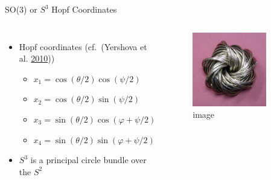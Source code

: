 \documentclass[10pt,ignorenonframetext,serif,onlymath]{beamer}
\begin{document}
\begin{frame}{SO(3) or \(S^3\) Hopf Coordinates}
\protect\hypertarget{so3-or-s3-hopf-coordinates}{}

\begin{columns}


\begin{itemize}
\item
  Hopf coordinates (cf.~(Yershova et al.
  \protect\hyperlink{ref-yershova2010generating}{2010}))

  \begin{itemize}
  \item
    \(x_1 = \cos(\theta/2) \cos(\psi/2)\)
  \item
    \(x_2 = \cos(\theta/2) \sin(\psi/2)\)
  \item
    \(x_3 = \sin(\theta/2) \cos(\varphi + \psi/2)\)
  \item
    \(x_4 = \sin(\theta/2) \sin(\varphi + \psi/2)\)
  \end{itemize}
\item
  \(S^3\) is a principal circle bundle over the \(S^2\)
\end{itemize}


\begin{figure}
\centering
\includegraphics[width=0.8\textwidth,height=\textheight]{Hopfkeyrings.jpg}
\caption{image}
\end{figure}

\end{columns}

\end{frame}
\end{document}

